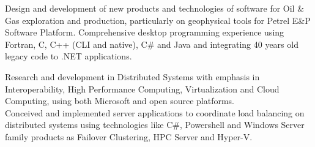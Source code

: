 \documentclass[11pt, a4paper, sans]{moderncv} %
\begin{document}
{
Design and development of new products and technologies of software for Oil \& Gas exploration and production, particularly on geophysical tools for Petrel E\&P Software Platform. 
Comprehensive desktop programming experience using Fortran, C, C++ (CLI and native), C\# and Java and integrating 40 years old legacy code to .NET applications.
}





{
Research and development in Distributed Systems with emphasis in Interoperability, High Performance Computing, Virtualization and Cloud Computing, using both Microsoft and open source platforms.\\
Conceived and implemented server applications to coordinate load balancing on distributed systems using technologies like C\#, Powershell and Windows Server family products as Failover Clustering, HPC Server and Hyper-V.
}








\end{document}
